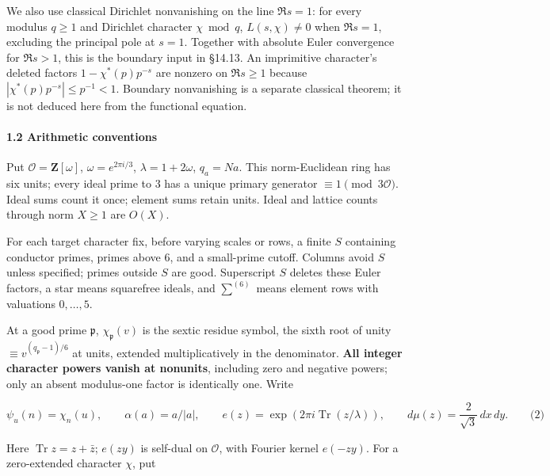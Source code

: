 We also use classical Dirichlet nonvanishing on the line \(\Re s=1\): for every modulus \(q\ge1\) and Dirichlet character \(\chi\bmod q\), \(L(s,\chi)\ne0\) when \(\Re s=1\), excluding the principal pole at \(s=1\). Together with absolute Euler convergence for \(\Re s>1\), this is the boundary input in §14.13. An imprimitive character's deleted factors \(1-\chi^*(p)p^{-s}\) are nonzero on \(\Re s\ge1\) because \(|\chi^*(p)p^{-s}|\le p^{-1}<1\). Boundary nonvanishing is a separate classical theorem; it is not deduced here from the functional equation.

\hypertarget{cf:sec:1.1}{}

\label{cf:sec:1.1}

\hypertarget{arithmetic-conventions}{%
\paragraph{1.2 Arithmetic conventions}\label{arithmetic-conventions}}

Put \(\mathcal O=\mathbf Z[\omega]\), \(\omega=e^{2\pi i/3}\), \(\lambda=1+2\omega\), \(q_a=Na\). This norm-Euclidean ring has six units; every ideal prime to \(3\) has a unique primary generator \(\equiv1\pmod{3\mathcal O}\). Ideal sums count it once; element sums retain units. Ideal and lattice counts through norm \(X\ge1\) are \(O(X)\).

For each target character fix, before varying scales or rows, a finite \(S\) containing conductor primes, primes above \(6\), and a small-prime cutoff. Columns avoid \(S\) unless specified; primes outside \(S\) are good. Superscript \(S\) deletes these Euler factors, a star means squarefree ideals, and \(\sum^{(6)}\) means element rows with valuations \(0,\ldots,5\).

At a good prime \(\mathfrak p\), \(\chi_{\mathfrak p}(v)\) is the sextic residue symbol, the sixth root of unity \(\equiv v^{(q_{\mathfrak p}-1)/6}\) at units, extended multiplicatively in the denominator. \textbf{All integer character powers vanish at nonunits}, including zero and negative powers; only an absent modulus-one factor is identically one. Write

\hypertarget{cf:eq:1.1}{}

\label{cf:eq:1.1}

\[
\psi_u(n)=\chi_n(u),\qquad \alpha(a)=a/|a|,\qquad
 e(z)=\exp\!\left(2\pi i\operatorname{Tr}(z/\lambda)\right),\qquad
 d\mu(z)=\frac2{\sqrt3}\,dx\,dy.
\qquad\text{(2)}
\]

Here \(\operatorname{Tr}z=z+\bar z\); \(e(zy)\) is self-dual on \(\mathcal O\), with Fourier kernel \(e(-zy)\). For a zero-extended character \(\chi\), put

